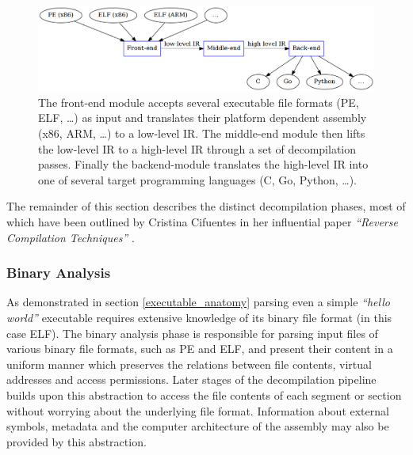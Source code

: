 \documentclass[12pt, a4paper]{article}
\begin{document}
\begin{figure}[htbp]
	\begin{center}
		\includegraphics[width=\textwidth]{inc/modules_overview.png}
		\caption{The front-end module accepts several executable file formats (PE, ELF, …) as input and translates their platform dependent assembly (x86, ARM, …) to a low-level IR. The middle-end module then lifts the low-level IR to a high-level IR through a set of decompilation passes. Finally the backend-module translates the high-level IR into one of several target programming languages (C, Go, Python, …).}
		\label{modules_overview}
	\end{center}
\end{figure}

The remainder of this section describes the distinct decompilation phases, most of which have been outlined by Cristina Cifuentes in her influential paper \textit{``Reverse Compilation Techniques''} \cite{rev_comp}.


\subsubsection{Binary Analysis}

As demonstrated in section \ref{executable_anatomy} parsing even a simple \textit{``hello world''} executable requires extensive knowledge of its binary file format (in this case ELF). The binary analysis phase is responsible for parsing input files of various binary file formats, such as PE and ELF, and present their content in a uniform manner which preserves the relations between file contents, virtual addresses and access permissions. Later stages of the decompilation pipeline builds upon this abstraction to access the file contents of each segment or section without worrying about the underlying file format. Information about external symbols, metadata and the computer architecture of the assembly may also be provided by this abstraction.

\end{document}
